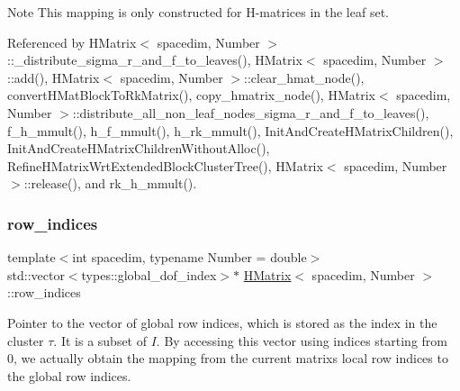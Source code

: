 \begin{DoxyDescription}
\item[Note ]This mapping is only constructed for H-\/matrices in the leaf set. 
\end{DoxyDescription}

Referenced by H\+Matrix$<$ spacedim, Number $>$\+::\+\_\+distribute\+\_\+sigma\+\_\+r\+\_\+and\+\_\+f\+\_\+to\+\_\+leaves(), H\+Matrix$<$ spacedim, Number $>$\+::add(), H\+Matrix$<$ spacedim, Number $>$\+::clear\+\_\+hmat\+\_\+node(), convert\+H\+Mat\+Block\+To\+Rk\+Matrix(), copy\+\_\+hmatrix\+\_\+node(), H\+Matrix$<$ spacedim, Number $>$\+::distribute\+\_\+all\+\_\+non\+\_\+leaf\+\_\+nodes\+\_\+sigma\+\_\+r\+\_\+and\+\_\+f\+\_\+to\+\_\+leaves(), f\+\_\+h\+\_\+mmult(), h\+\_\+f\+\_\+mmult(), h\+\_\+rk\+\_\+mmult(), Init\+And\+Create\+H\+Matrix\+Children(), Init\+And\+Create\+H\+Matrix\+Children\+Without\+Alloc(), Refine\+H\+Matrix\+Wrt\+Extended\+Block\+Cluster\+Tree(), H\+Matrix$<$ spacedim, Number $>$\+::release(), and rk\+\_\+h\+\_\+mmult().

\mbox{\label{classHMatrix_a33b3a936f1b40e320e96d47471da07ae}} 
\subsubsection{\texorpdfstring{row\+\_\+indices}{row\_indices}}
{\footnotesize\ttfamily template$<$int spacedim, typename Number = double$>$ \\
std\+::vector$<$types\+::global\+\_\+dof\+\_\+index$>$$\ast$ \hyperlink{classHMatrix}{H\+Matrix}$<$ spacedim, Number $>$\+::row\+\_\+indices\hspace{0.3cm}{\ttfamily [private]}}

Pointer to the vector of global row indices, which is stored as the index in the cluster $\tau$. It is a subset of $I$. By accessing this vector using indices starting from 0, we actually obtain the mapping from the current matrix\textquotesingle{}s local row indices to the global row indices. 

